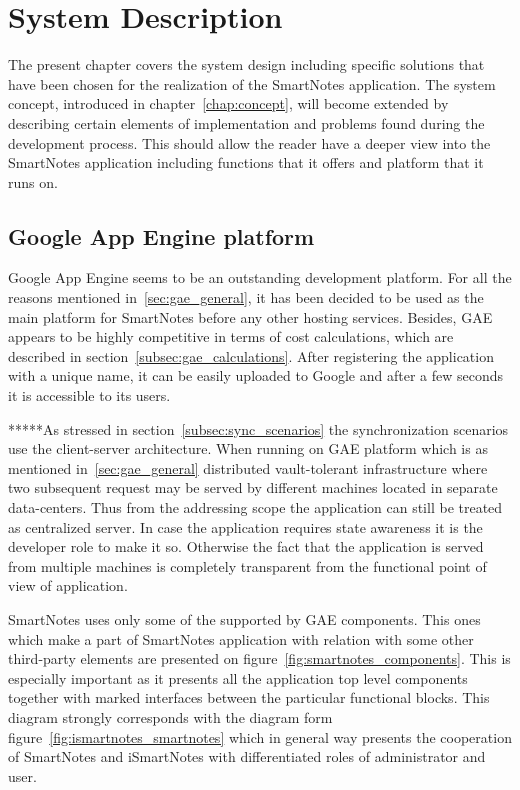 \chapter{System Description}\label{chap:sys_description}
The present chapter covers the system design including specific solutions that have been chosen for the realization of the SmartNotes application. The system concept, introduced in chapter~\ref{chap:concept}, will become extended by describing certain elements of implementation and problems found during the development process. This should allow the reader have a deeper view into the SmartNotes application including functions that it offers and platform that it runs on.
\section{Google App Engine platform}\label{sec:gae}
Google App Engine seems to be an outstanding development platform. For all the reasons mentioned in~\ref{sec:gae_general}, it has been decided to be used as the main platform for SmartNotes before any other hosting services. Besides, GAE appears to be highly competitive in terms of cost calculations, which are described in section~\ref{subsec:gae_calculations}. After registering the application with a unique name, it can be easily uploaded to Google and after a few seconds it is accessible to its users.

*****As stressed in section~\ref{subsec:sync_scenarios} the synchronization scenarios use the client-server architecture. When running on GAE platform which is as mentioned in~\ref{sec:gae_general} distributed vault-tolerant infrastructure where two subsequent request may be served by different machines located in separate data-centers. Thus from the addressing scope the application can still be treated as centralized server. In case the application requires state awareness it is the developer role to make it so. Otherwise the fact that the application is served from multiple machines is completely transparent from the functional point of view of application. 

SmartNotes uses only some of the supported by GAE components. This ones which make a part of SmartNotes application with relation with some other third-party elements are presented on figure~\ref{fig:smartnotes_components}. This is especially important as it presents all the application top level components together with marked interfaces between the particular functional blocks. This diagram strongly corresponds with the diagram form figure~\ref{fig:ismartnotes_smartnotes} which in general way presents the cooperation of SmartNotes and iSmartNotes with differentiated roles of administrator and user. 

